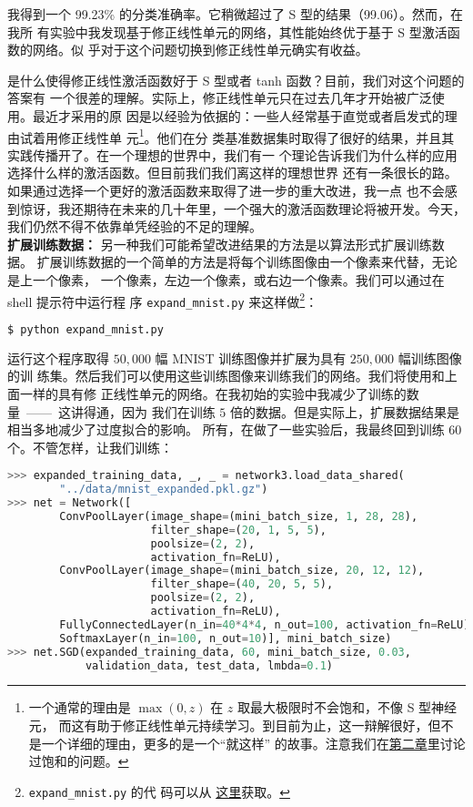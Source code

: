 我得到一个 99.23\% 的分类准确率。它稍微超过了 S 型的结果（99.06）。然而，在我所
有实验中我发现基于修正线性单元的网络，其性能始终优于基于 S 型激活函数的网络。似
乎对于这个问题切换到修正线性单元确实有收益。

是什么使得修正线性激活函数好于 S 型或者 tanh 函数？目前，我们对这个问题的答案有
一个很差的理解。实际上，修正线性单元只在过去几年才开始被广泛使用。最近才采用的原
因是以经验为依据的：一些人经常基于直觉或者启发式的理由试着用修正线性单
元\footnote{一个通常的理由是 $\max(0, z)$ 在 $z$ 取最大极限时不会饱和，不像 S 型神经元，
而这有助于修正线性单元持续学习。到目前为止，这一辩解很好，但不是一个详细的理由，更多的是一个“就这样”
的故事。注意我们在\hyperref[saturation]{第二章}里讨论过饱和的问题。}。他们在分
类基准数据集时取得了很好的结果，并且其实践传播开了。在一个理想的世界中，我们有一
个理论告诉我们为什么样的应用选择什么样的激活函数。但目前我们我们离这样的理想世界
还有一条很长的路。如果通过选择一个更好的激活函数来取得了进一步的重大改进，我一点
也不会感到惊讶，我还期待在未来的几十年里，一个强大的激活函数理论将被开发。今天，
我们仍然不得不依靠单凭经验的不足的理解。\\

\textbf{扩展训练数据：} 另一种我们可能希望改进结果的方法是以算法形式扩展训练数据。
扩展训练数据的一个简单的方法是将每个训练图像由一个像素来代替，无论是上一个像素，
一个像素，左边一个像素，或右边一个像素。我们可以通过在 shell 提示符中运行程
序 \lstinline!expand_mnist.py! 来这样做\footnote{\lstinline!expand_mnist.py! 的代
  码可以从%
  \href{https://github.com/mnielsen/neural-networks-and-deep-learning/blob/master/src/expand_mnist.py}{%
    这里}获取。}：
\begin{lstlisting}[language=Python]
$ python expand_mnist.py
\end{lstlisting}

运行这个程序取得 $50,000$ 幅 MNIST 训练图像并扩展为具有 $250,000$ 幅训练图像的训
练集。然后我们可以使用这些训练图像来训练我们的网络。我们将使用和上面一样的具有修
正线性单元的网络。在我初始的实验中我减少了训练\epochs{}的数量~——~这讲得通，因为
我们在训练 $5$ 倍的数据。但是实际上，扩展数据结果是相当多地减少了过度拟合的影响。
所有，在做了一些实验后，我最终回到训练 $60$ 个\epochs{}。不管怎样，让我们训练：
\begin{lstlisting}[language=Python]
>>> expanded_training_data, _, _ = network3.load_data_shared(
        "../data/mnist_expanded.pkl.gz")
>>> net = Network([
        ConvPoolLayer(image_shape=(mini_batch_size, 1, 28, 28), 
                      filter_shape=(20, 1, 5, 5), 
                      poolsize=(2, 2), 
                      activation_fn=ReLU),
        ConvPoolLayer(image_shape=(mini_batch_size, 20, 12, 12), 
                      filter_shape=(40, 20, 5, 5), 
                      poolsize=(2, 2), 
                      activation_fn=ReLU),
        FullyConnectedLayer(n_in=40*4*4, n_out=100, activation_fn=ReLU),
        SoftmaxLayer(n_in=100, n_out=10)], mini_batch_size)
>>> net.SGD(expanded_training_data, 60, mini_batch_size, 0.03, 
            validation_data, test_data, lmbda=0.1)
\end{lstlisting}

